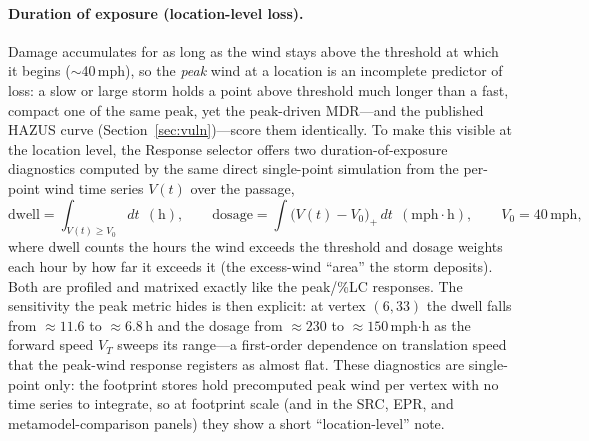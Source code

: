 \documentclass[11pt]{article}
\begin{document}
\paragraph{Duration of exposure (location-level loss).}
Damage accumulates for as long as the wind stays above the threshold at which it
begins ($\sim$40\,mph), so the \emph{peak} wind at a location is an incomplete
predictor of loss: a slow or large storm holds a point above threshold much longer
than a fast, compact one of the same peak, yet the peak-driven MDR---and the
published HAZUS curve (Section~\ref{sec:vuln})---score them identically. To make
this visible at the location level, the Response selector offers two
duration-of-exposure diagnostics computed by the same direct single-point
simulation from the per-point wind time series $V(t)$ over the passage,
\[
\text{dwell}=\!\!\int_{V(t)\ge V_0}\!\!\!\! dt \ \ (\text{h}),
\qquad
\text{dosage}=\!\!\int \big(V(t)-V_0\big)_{+}\, dt \ \ (\text{mph}{\cdot}\text{h}),
\qquad V_0=40\,\text{mph},
\]
where dwell counts the hours the wind exceeds the threshold and dosage weights each
hour by how far it exceeds it (the excess-wind ``area'' the storm deposits). Both
are profiled and matrixed exactly like the peak/\%LC responses. The sensitivity the
peak metric hides is then explicit: at vertex $(6,33)$ the dwell falls from
$\approx11.6$ to $\approx6.8$\,h and the dosage from $\approx230$ to
$\approx150$\,mph$\cdot$h as the forward speed $V_T$ sweeps its range---a
first-order dependence on translation speed that the peak-wind response registers
as almost flat. These diagnostics are single-point only: the footprint stores hold
precomputed peak wind per vertex with no time series to integrate, so at footprint
scale (and in the SRC, EPR, and metamodel-comparison panels) they show a short
``location-level'' note.
\end{document}
